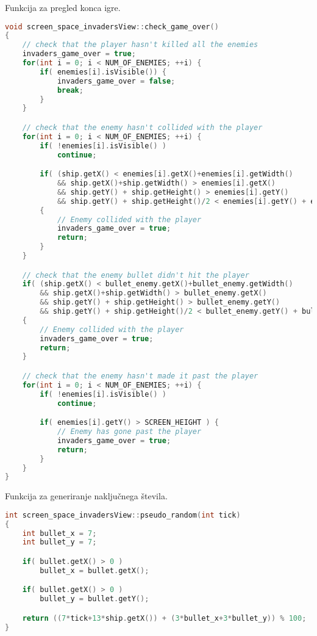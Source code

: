 \documentclass{article}
\begin{document}
\noindent
Funkcija za pregled konca igre.
\begin{lstlisting}[language=c++]
void screen_space_invadersView::check_game_over()
{
	// check that the player hasn't killed all the enemies
	invaders_game_over = true;
	for(int i = 0; i < NUM_OF_ENEMIES; ++i) {
		if( enemies[i].isVisible()) {
			invaders_game_over = false;
			break;
		}
	}

	// check that the enemy hasn't collided with the player
	for(int i = 0; i < NUM_OF_ENEMIES; ++i) {
		if( !enemies[i].isVisible() )
			continue;

		if( (ship.getX() < enemies[i].getX()+enemies[i].getWidth()
			&& ship.getX()+ship.getWidth() > enemies[i].getX()
			&& ship.getY() + ship.getHeight() > enemies[i].getY()
			&& ship.getY() + ship.getHeight()/2 < enemies[i].getY() + enemies[i].getHeight()))
		{
			// Enemy collided with the player
			invaders_game_over = true;
			return;
		}
	}

	// check that the enemy bullet didn't hit the player
	if( (ship.getX() < bullet_enemy.getX()+bullet_enemy.getWidth()
		&& ship.getX()+ship.getWidth() > bullet_enemy.getX()
		&& ship.getY() + ship.getHeight() > bullet_enemy.getY()
		&& ship.getY() + ship.getHeight()/2 < bullet_enemy.getY() + bullet_enemy.getHeight()))
	{
		// Enemy collided with the player
		invaders_game_over = true;
		return;
	}

	// check that the enemy hasn't made it past the player
	for(int i = 0; i < NUM_OF_ENEMIES; ++i) {
		if( !enemies[i].isVisible() )
			continue;

		if( enemies[i].getY() > SCREEN_HEIGHT ) {
			// Enemy has gone past the player
			invaders_game_over = true;
			return;
		}
	}
}
\end{lstlisting}

\noindent
Funkcija za generiranje naklju\v{c}nega \v{s}tevila.
\begin{lstlisting}[language=c++]
int screen_space_invadersView::pseudo_random(int tick)
{
	int bullet_x = 7;
	int bullet_y = 7;

	if( bullet.getX() > 0 )
		bullet_x = bullet.getX();

	if( bullet.getX() > 0 )
		bullet_y = bullet.getY();

	return ((7*tick+13*ship.getX()) + (3*bullet_x+3*bullet_y)) % 100;
}
\end{lstlisting}
\end{document}

